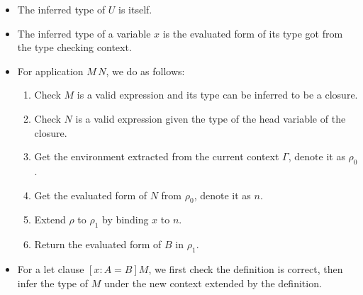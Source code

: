 \begin{itemize}
\item The inferred type of $U$ is itself.
\item The inferred type of a variable $x$ is the evaluated form of its type got from the type checking context.
\item For application $M\,N$, we do as follows:
  \begin{enumerate}
  \item Check $M$ is a valid expression and its type can be inferred to be a closure.
  \item Check $N$ is a valid expression given the type of the head variable of the closure.
  \item Get the environment extracted from the current context $\Gamma$, denote it as $\rho_0$.
  \item Get the evaluated form of $N$ from $\rho_0$, denote it as $n$.
  \item Extend $\rho$ to $\rho_1$ by binding $x$ to $n$.
  \item Return the evaluated form of $B$ in $\rho_1$.
  \end{enumerate}
\item For a let clause $[x : A = B] M$, we first check the definition is correct, then infer the type of $M$ under the new context extended by the definition.
\end{itemize}

